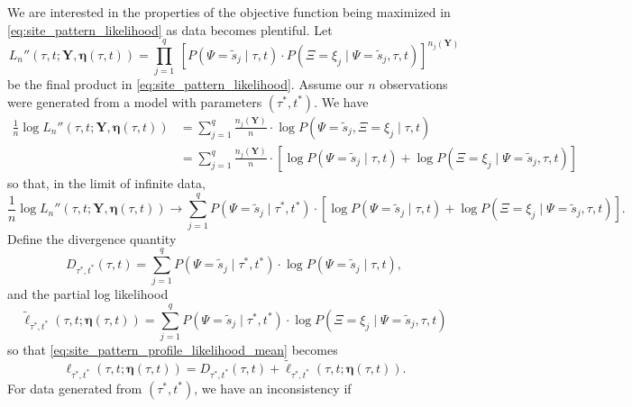\documentclass{article}
\newcommand{\fullAlignment}{\mathbf{Y}}
\newcommand{\siteSplit}{\tilde{s}}
\newcommand{\fullAncestralSplitPartitions}{\boldsymbol\eta}
\newcommand{\siteSplitRV}{\Psi}
\newcommand{\ancestralSplitRV}{\Xi}
\newcommand{\nCols}{n}
\newcommand{\nSiteSplits}{q}
\newcommand{\shannonDivergence}{D}
\begin{document}
We are interested in the properties of the objective function being maximized in \eqref{eq:site_pattern_likelihood} as data becomes plentiful.
Let
$$
L_\nCols''(\tau, t; \fullAlignment, \fullAncestralSplitPartitions(\tau, t)) = \prod_{j=1}^{\nSiteSplits} \ \left[P(\siteSplitRV=\siteSplit_j \mid \tau, t) \cdot P(\ancestralSplitRV=\xi_j \mid \siteSplitRV=\siteSplit_j, \tau, t)\right] ^{\nCols_j(\fullAlignment)}
$$
be the final product in \eqref{eq:site_pattern_likelihood}.
Assume our $\nCols$ observations were generated from a model with parameters $(\tau^*, t^*)$.
We have
\begin{align}
    \frac{1}{\nCols} \log L_\nCols''(\tau, t; \fullAlignment, \fullAncestralSplitPartitions(\tau,t))
        &= \sum_{j=1}^\nSiteSplits \frac{\nCols_j(\fullAlignment)}{\nCols}\cdot  \log P(\siteSplitRV=\siteSplit_j, \ancestralSplitRV=\xi_j \mid \tau, t) \\
        &= \sum_{j=1}^\nSiteSplits \frac{\nCols_j(\fullAlignment)}{\nCols}\cdot [\log P(\siteSplitRV=\siteSplit_j \mid \tau, t) +
            \log P(\ancestralSplitRV=\xi_j \mid \siteSplitRV=\siteSplit_j , \tau, t)]
\end{align}
so that, in the limit of infinite data,
\begin{equation}
    \frac{1}{\nCols} \log L_\nCols''(\tau, t; \fullAlignment, \fullAncestralSplitPartitions(\tau, t)) \rightarrow \sum_{j=1}^\nSiteSplits P(\siteSplitRV=\siteSplit_j \mid \tau^*, t^*) \cdot [\log P(\siteSplitRV=\siteSplit_j \mid \tau, t) + \log P(\ancestralSplitRV=\xi_j \mid \siteSplitRV=\siteSplit_j , \tau, t)]. \label{eq:site_pattern_profile_likelihood_mean}
\end{equation}
Define the divergence quantity
$$
\shannonDivergence_{\tau^*,t^*}(\tau,t) = \sum_{j=1}^\nSiteSplits P(\siteSplitRV=\siteSplit_j \mid \tau^*, t^*)\cdot\log P(\siteSplitRV=\siteSplit_j \mid \tau, t),
$$
and the partial log likelihood
$$
\tilde{\ell}_{\tau^*,t^*}(\tau, t; \fullAncestralSplitPartitions(\tau,t)) = \sum_{j=1}^\nSiteSplits P(\siteSplitRV=\siteSplit_j \mid \tau^*, t^*)\cdot\log P(\ancestralSplitRV=\xi_j \mid \siteSplitRV = \siteSplit_j, \tau, t)
$$
so that \eqref{eq:site_pattern_profile_likelihood_mean} becomes
\begin{equation}
    \label{eq:log_likelihood_simplified}
    \ell_{\tau^*,t^*}(\tau, t; \fullAncestralSplitPartitions(\tau,t)) = \shannonDivergence_{\tau^*,t^*}(\tau,t) + \tilde{\ell}_{\tau^*,t^*}(\tau, t; \fullAncestralSplitPartitions(\tau,t)).
\end{equation}
For data generated from $(\tau^*, t^*)$, we have an inconsistency if
\end{document}

